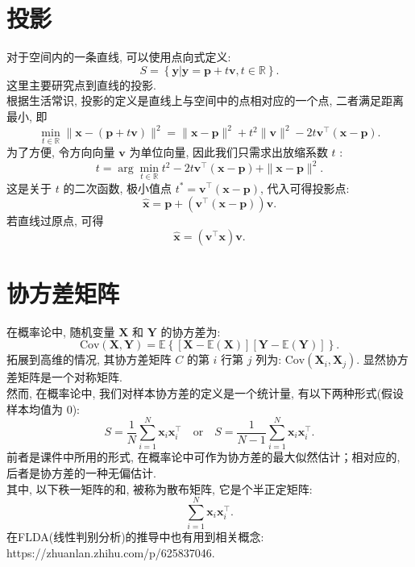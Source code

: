 \documentclass[lang = cn]{elegantpaper}
\begin{document}
\section{投影}
\noindent
对于空间内的一条直线, 可以使用点向式定义:
\begin{equation*}
    S = \left\{\bm{y}|\bm{y} = \bm{p} + t\bm{v}, t\in\mathbb{R}\right\}.
\end{equation*}
这里主要研究点到直线的投影.\\
根据生活常识, 投影的定义是直线上与空间中的点相对应的一个点, 二者满足距离最小, 即
\begin{equation*}
    \min_{t \in \mathbb{R}} \|\bm{x}-(\bm{p}+t\bm{v})\|^2 = \|\bm{x}-\bm{p}\|^2 +t^2 \|\bm{v}\|^2 - 2t\bm{v}^\top(\bm{x}-\bm{p}).
\end{equation*}
为了方便, 令方向向量 $\bm{v}$ 为单位向量, 因此我们只需求出放缩系数 $t$ :
\begin{equation*}
    t = \arg \min_{t\in\mathbb{R}} t^2 -2t\bm{v}^\top(\bm{x}-\bm{p}) + \|\bm{x}-\bm{p}\|^2.
\end{equation*}
这是关于 $t$ 的二次函数, 极小值点 $t^{*} = \bm{v}^\top(\bm{x}-\bm{p})$, 代入可得投影点:
\begin{equation*}
    \widehat{\bm{x}} = \bm{p} + (\bm{v}^\top(\bm{x}-\bm{p}))\bm{v}.
\end{equation*}
若直线过原点, 可得
\begin{equation*}
    \widehat{\bm{x}} = (\bm{v}^\top \bm{x})\bm{v}.
\end{equation*}
\section{协方差矩阵}
\noindent
在概率论中, 随机变量 $\mathbf{X}$ 和 $\mathbf{Y}$ 的协方差为:
\begin{equation*}
    \mathrm{Cov}(\mathbf{X},\mathbf{Y}) = \mathbb{E}\left\{[\mathbf{X}-\mathbb{E}(\mathbf{X})][\mathbf{Y}-\mathbb{E}(\mathbf{Y})]\right\}.
\end{equation*}
拓展到高维的情况, 其协方差矩阵 $C$ 的第 $i$ 行第 $j$ 列为: $\mathrm{Cov}(\mathbf{X}_i,\mathbf{X}_j)$. 显然协方差矩阵是一个对称矩阵.\\
然而, 在概率论中, 我们对样本协方差的定义是一个统计量, 有以下两种形式(假设样本均值为 0):
\begin{equation*}
    S = \frac{1}{N}\sum_{i=1}^N \bm{x}_i\bm{x}_i^\top \quad \mathrm{or} \quad S = \frac{1}{N-1}\sum_{i=1}^N \bm{x}_i\bm{x}_i^\top.
\end{equation*}
前者是课件中所用的形式, 在概率论中可作为协方差的最大似然估计；相对应的, 后者是协方差的一种无偏估计.\\
其中, 以下秩一矩阵的和, 被称为散布矩阵, 它是个半正定矩阵:
\begin{equation*}
    \sum_{i=1}^N \bm{x}_i\bm{x}_i^\top.
\end{equation*}
在FLDA(线性判别分析)的推导中也有用到相关概念: https://zhuanlan.zhihu.com/p/625837046.
\end{document}
